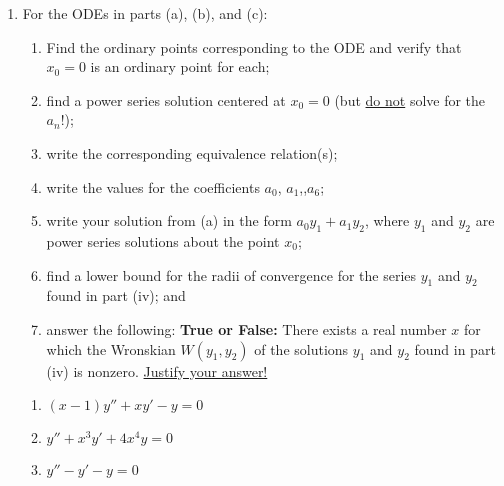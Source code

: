 \documentclass[12pt]{article}
\theoremstyle{definition}
\theoremstyle{underl}
\begin{document}
\begin{enumerate}[topsep=0.125in,itemsep=0.375in]
		\item For the ODEs in parts (a), (b), and (c):
		\begin{enumerate}[label=(\roman*),leftmargin=0.55in,rightmargin=0.55in,topsep=0mm,itemsep=1.5mm] 
			\item Find the ordinary points corresponding to the ODE and verify that $x_0=0$ is an ordinary point for each;
			\item find a power series solution centered at $x_0=0$ (but \ul{do not} solve for the $a_n$!);
			\item write the corresponding equivalence relation(s);
			\item write the values for the coefficients $a_0$, $a_1$,\textellipsis,$a_6$;
			\item write your solution from (a) in the form $a_0y_1+a_1y_2$, where $y_1$ and $y_2$ are power series solutions about the point $x_0$;
			\item find a lower bound for the radii of convergence for the series $y_1$ and $y_2$ found in part (iv); and
			\item answer the following: \textbf{True or False:} There exists a real number $x$ for which the Wronskian $W(y_1,y_2)$ of the solutions $y_1$ and $y_2$ found in part (iv) is nonzero. \ul{Justify your answer!}
		\end{enumerate}
			\begin{enumerate}[itemsep=3mm]
				\item $(x-1)y''+xy'-y=0$
				\item $y''+x^3y'+4x^4y=0$
				\item $y''-y'-y=0$
			\end{enumerate}
	\end{enumerate}
\end{document}
